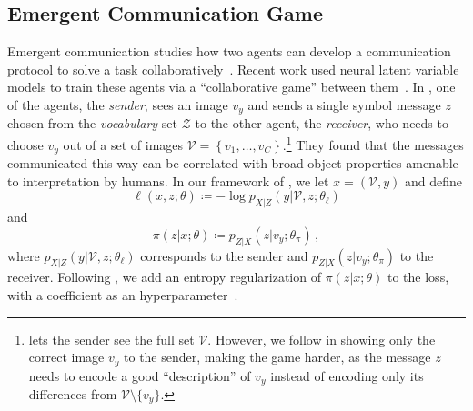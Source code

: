 \subsection{Emergent Communication Game}\label{sec:comm}

\noindent Emergent communication studies how two agents can develop a
communication protocol to solve a task
collaboratively~\citep{kirby2002natural}. Recent work used neural
latent variable models to train these agents via a ``collaborative
game'' between
them~\citep{Lazaridou2017,Havrylov2017,
    jorge2016learning, foerster2016learning, sukhbaatar2016learning}. In
\citet{Lazaridou2017}, one of the agents, the \emph{sender}, sees an
image $v_y$ and sends a single symbol message $z$ chosen from the \emph{vocabulary} set
$\mathcal{Z}$ to the other agent, the
\emph{receiver}, who needs to choose $v_y$ out of
a set of images $\mathcal{V} = \left\{ v_1, \dots, v_C
    \right\}$.\footnote{\citet{Lazaridou2017} lets the sender see the
    full set $\mathcal{V}$. However, we follow \citet{Havrylov2017}
    in showing only the correct image $v_y$ to the sender, making the
    game harder, as the message $z$ needs to encode a good
    ``description'' of $v_y$ instead of encoding only
    its differences from $\mathcal{V}\setminus \{v_y\}$.} They found that
the messages communicated this way can be correlated with broad
object properties amenable to interpretation by humans. In our
framework of , we let $x = (\mathcal{V}, y)$ and define
%
\begin{equation}
    \ell (x, z; \theta) \coloneqq -\log p_{X|Z}(y |\mathcal{V}, z; \theta_\ell)
\end{equation}
%
and
%
\begin{equation}
    \pi (z |x; \theta) \coloneqq p_{Z|X}(z |v_y; \theta_\pi)\,,
\end{equation}
%
where
$p_{X|Z}(y |\mathcal{V}, z; \theta_\ell)$ corresponds to the sender and
$p_{Z|X}(z |v_y; \theta_\pi)$ to the receiver. Following
\citet{Lazaridou2017}, we add an entropy regularization of $\pi (z
    |x; \theta)$ to the loss, with a coefficient as an
hyperparameter~\citep{Mnih2016}.

